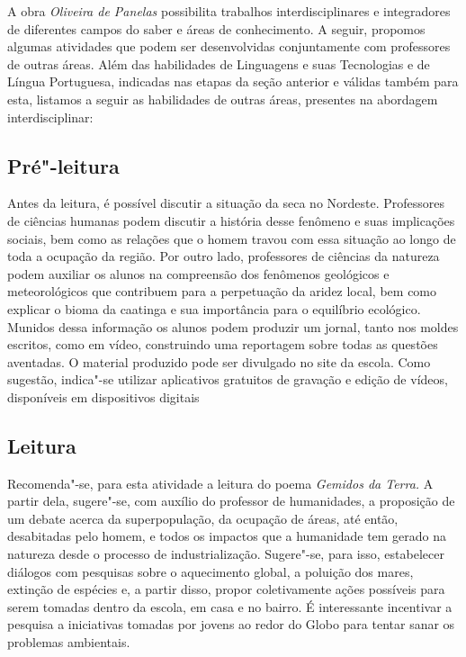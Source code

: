 \documentclass[12pt]{extarticle}
\begin{document}
A obra \emph{Oliveira de Panelas} possibilita trabalhos
interdisciplinares e integradores de diferentes campos do saber e áreas
de conhecimento. A seguir, propomos algumas atividades que podem ser
desenvolvidas conjuntamente com professores de outras áreas. Além das
habilidades de Linguagens e suas Tecnologias e de Língua Portuguesa,
indicadas nas etapas da seção anterior e válidas também para esta,
listamos a seguir as habilidades de outras áreas, presentes na abordagem
interdisciplinar:


\subsection{Pré"-leitura}

Antes da
leitura, é possível discutir a situação da seca no Nordeste. Professores
de ciências humanas podem discutir a história desse fenômeno e suas
implicações sociais, bem como as relações que o homem travou com essa
situação ao longo de toda a ocupação da região. Por outro lado,
professores de ciências da natureza podem auxiliar os alunos na
compreensão dos fenômenos geológicos e meteorológicos que contribuem
para a perpetuação da aridez local, bem como explicar o bioma da
caatinga e sua importância para o equilíbrio ecológico. Munidos dessa
informação os alunos podem produzir um jornal, tanto nos moldes
escritos, como em vídeo, construindo uma reportagem sobre todas as
questões aventadas. O material produzido pode ser divulgado no site da
escola. Como sugestão, indica"-se utilizar aplicativos gratuitos de
gravação e edição de vídeos, disponíveis em dispositivos digitais


\subsection{Leitura}

Recomenda"-se, para esta atividade a leitura do poema
\emph{Gemidos da Terra.} A partir dela, sugere"-se, com auxílio do
professor de humanidades, a proposição de um debate acerca da
superpopulação, da ocupação de áreas, até então, desabitadas pelo homem,
e todos os impactos que a humanidade tem gerado na natureza desde o
processo de industrialização. Sugere"-se, para isso, estabelecer diálogos
com pesquisas sobre o aquecimento global, a poluição dos mares, extinção
de espécies e, a partir disso, propor coletivamente ações possíveis para
serem tomadas dentro da escola, em casa e no bairro. É interessante
incentivar a pesquisa a iniciativas tomadas por jovens ao redor do Globo
para tentar sanar os problemas ambientais.
\end{document}
